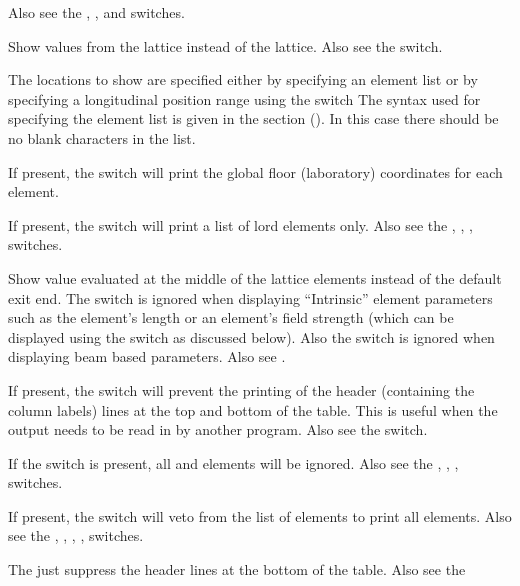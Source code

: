 {{{{{{{{\begin{description}
Also see the , , and  switches.
%
\item[-design] \Newline
Show values from the  lattice instead of the  lattice. Also see the 
switch.
%
\item[<element_list>] \Newline
The locations to show are specified either by specifying an element list or by specifying a
longitudinal position range using the  switch The syntax used for specifying the element list
is given in the  section (). In this case
there should be no blank characters in the list.
%
\item[-floor_coords] \Newline
If present, the  switch will print the global floor (laboratory) coordinates for
each element.
%
\item[-lords] \Newline
If present, the  switch will print a list of lord elements only. Also see the
, , ,  switches.
%
\item[-middle] \Newline
Show value evaluated at the middle of the lattice elements instead of the default exit end.
The  switch is ignored when displaying ``Intrinsic'' element
parameters such as the element's length or an element's field strength (which can be displayed using
the  switch as discussed below). Also the  switch is ignored when
displaying beam based parameters. Also see .
%
\item[-no_label_lines] \Newline
If present, the  switch will prevent the printing of the header (containing the
column labels) lines at the top and bottom of the table.  This is useful when the output needs to be
read in by another program. Also see the  switch.
%
\item[-no_slaves] \Newline
If the  switch is present, all  and  elements
will be ignored. Also see the , , , 
switches.
%
\item[-no_super_slaves] \Newline
If present, the  switch will veto from the list of elements to print all
 elements. Also see the , , , ,
 switches.
%
\item[-no_tail_lines] \Newline
The  just suppress the header lines at the bottom of the table. Also see the

\end{description}}}}}}}}}
